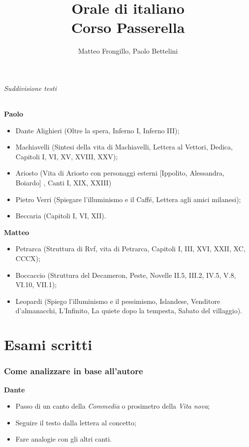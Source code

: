 \documentclass{article}
\title{\textbf{Orale di italiano\\Corso Passerella}}
\author{Matteo Frongillo, Paolo Bettelini}
\begin{document}
\maketitle
\tableofcontents
\phantom{}
\pagebreak


\paragraph*{Suddivisione testi}

\textbf{Paolo}
\begin{itemize}
    \item Dante Alighieri (Oltre la spera, Inferno I, Inferno III);
    \item Machiavelli (Sintesi della vita di Machiavelli, Lettera al Vettori, Dedica, Capitoli I, VI, XV, XVIII, XXV);
    \item Ariosto (Vita di Ariosto con personaggi esterni [Ippolito, Alessandra, Boiardo] , Canti I, XIX, XXIII)
    \item Pietro Verri (Spiegare l'illuminismo e il Caffé, Lettera agli amici milanesi);
    \item Beccaria (Capitoli I, VI, XII).
\end{itemize}

\textbf{Matteo}
\begin{itemize}
    \item Petrarca (Struttura di Rvf, vita di Petrarca, Capitoli I, III, XVI, XXII, XC, CCCX);
    \item Boccaccio (Struttura del Decameron, Peste, Novelle II.5, III.2, IV.5, V.8, VI.10, VII.1);
    \item Leopardi (Spiego l'illuminismo e il pessimismo, Islandese, Venditore d'almanacchi, L'Infinito, La quiete dopo la tempesta, Sabato del villaggio).
\end{itemize}


\newpage
\part{Esami scritti}

\section{Come analizzare in base all'autore}
\textbf{Dante}
\begin{itemize}
    \item Passo di un canto della \textit{Commedia} o prosimetro della \textit{Vita nova};
    \item Seguire il testo dalla lettera al concetto;
    \item Fare analogie con gli altri canti.
\end{itemize}
\end{document}
